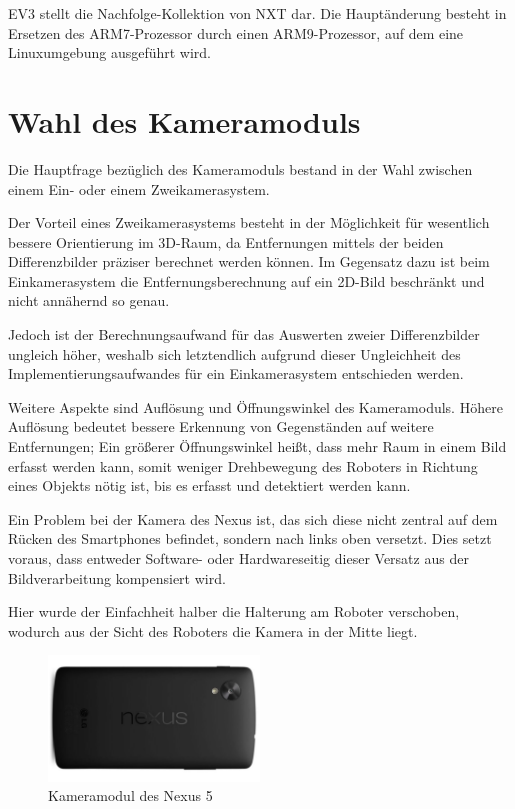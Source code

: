 EV3 stellt die Nachfolge-Kollektion von NXT dar. Die Hauptänderung besteht in Ersetzen des ARM7-Prozessor durch einen ARM9-Prozessor, auf dem eine Linuxumgebung ausgeführt wird.

\section{Wahl des Kameramoduls}
\label{sec:Kamera}

Die Hauptfrage bezüglich des Kameramoduls bestand in der Wahl zwischen einem Ein- oder einem Zweikamerasystem.

Der Vorteil eines Zweikamerasystems besteht in der Möglichkeit für wesentlich bessere Orientierung im 3D-Raum, da Entfernungen mittels der beiden Differenzbilder präziser berechnet werden können.
Im Gegensatz dazu ist beim Einkamerasystem die Entfernungsberechnung auf ein 2D-Bild beschränkt und nicht annähernd so genau.

Jedoch ist der Berechnungsaufwand für das Auswerten zweier Differenzbilder ungleich höher, weshalb sich letztendlich aufgrund dieser Ungleichheit des Implementierungsaufwandes für ein Einkamerasystem entschieden werden.

Weitere Aspekte sind Auflösung und Öffnungswinkel des Kameramoduls.
Höhere Auflösung bedeutet bessere Erkennung von Gegenständen auf weitere Entfernungen; Ein größerer Öffnungswinkel heißt, dass mehr Raum in einem Bild erfasst werden kann, somit weniger Drehbewegung des Roboters in Richtung eines Objekts nötig ist, bis es erfasst und detektiert werden kann.

Ein Problem bei der Kamera des Nexus ist, das sich diese nicht zentral auf dem Rücken des Smartphones befindet, sondern nach links oben versetzt. Dies setzt voraus, dass entweder Software- oder Hardwareseitig dieser Versatz aus der Bildverarbeitung kompensiert wird.

Hier wurde der Einfachheit halber die Halterung am Roboter verschoben, wodurch aus der Sicht des Roboters die Kamera in der Mitte liegt.

\begin{figure}[h]
\centering
\includegraphics[width=0.5\textwidth]{Bilder/Robot/nexus_backside}
\caption{Kameramodul des Nexus 5}
\label{fig:camera}
\end{figure}
